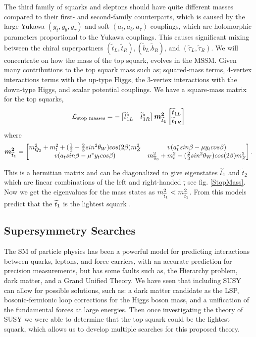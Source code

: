 The third family of squarks and sleptons should have quite different masses compared to their first- and second-family counterparts, which is caused by the large Yukawa $(y_t, y_b, y_\tau)$ and soft $(a_t, a_b, a_\tau)$ couplings, which are holomorphic parameters proportional to the Yukawa couplings. This causes significant mixing between the chiral superpartners $(\widetilde{t}_L, \widetilde{t}_R), (\widetilde{b}_L. \widetilde{b}_R)\text{, and } (\widetilde{\tau}_L, \widetilde{\tau}_R)$. We will concentrate on how the mass of the top squark, \st{} evolves in the MSSM. Given many contributions to the top squark mass such as; squared-mass terms, 4-vertex interactions terms with the up-type Higgs, the 3-vertex interactions with the down-type Higgs, and scalar potential couplings. We have a square-mass matrix for the top squarks, 
\begin{equation}
\mathcal{L}_{\text{stop masses}}=-
\begin{bmatrix}
\widetilde{t}_{1L}^* & \widetilde{t}_{1R}^* \\
\end{bmatrix}
\boldsymbol{m_{\widetilde{t}_1}^2}
\begin{bmatrix}
\widetilde{t}_{1L} \\
\widetilde{t}_{1R} \\
\end{bmatrix}
\end{equation}
where 
\begin{equation}
\boldsymbol{m_{\widetilde{t}_1}^2}=
\begin{bmatrix}
m_{Q_3}^2+m_t^2+(\frac{1}{2}-\frac{2}{3}sin^2\theta_W)cos(2\beta)m_Z^2 & v(a_t^*sin\beta-\mu y_tcos\beta) \\
v(a_tsin\beta-\mu^*y_tcos\beta) & m^2_{\overline{u}_3} +m_t^2+(\frac{2}{3}sin^2\theta_W)cos(2\beta)m^2_Z \\ 
\end{bmatrix}.
\end{equation}

This is a hermitian matrix and can be diagonalized to give eigenstates $\widetilde{t}_1$ and $\widetilde{t}_2$ which are linear combinations of the left and right-handed \st, see fig. \ref{StopMass}. Now we get the eigenvalues for the mass states as $m_{\widetilde{t}_1}^2<m_{\widetilde{t}_2}^2$. From this models predict that the $\widetilde{t}_1$ is the lightest squark \cite{martin_supersymmetry_1997}. 

\subsection{Supersymmetry Searches}
The SM of particle physics has been a powerful model for predicting interactions between quarks, leptons, and force carriers, with an accurate prediction for precision measurements, but has some faults such as, the Hierarchy problem, dark matter, and a Grand Unified Theory. We have seen that including SUSY can allow for possible solutions, such as: a dark matter candidate as the LSP, bosonic-fermionic loop corrections for the Higgs boson mass, and a unification of the fundamental forces at large energies. Then once investigating the theory of SUSY we were able to determine that the top squark could be the lightest squark, which allows us to develop multiple searches for this proposed theory. 

